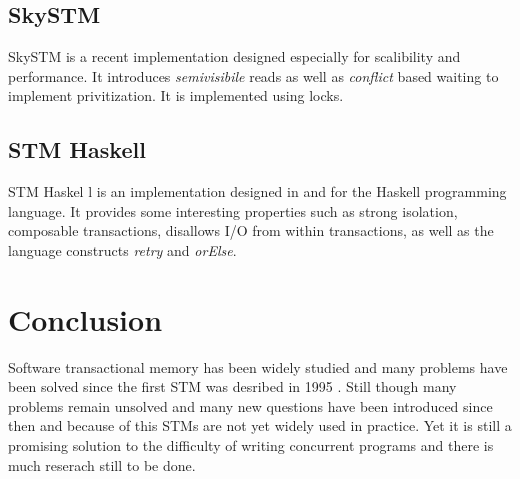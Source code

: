 \subsection{SkySTM}
SkySTM \cite{lev:anatomy:transact:2009} is a recent implementation designed especially for scalibility and performance.
It introduces \emph{semivisibile} reads as well as \emph{conflict} based waiting to implement privitization.
It is implemented using locks.

\subsection{STM Haskell}
STM Haskel \cite{sjbc000}l is an implementation designed in and for the Haskell programming language.
It provides some interesting properties such as strong isolation, composable transactions, disallows I/O from within transactions, as well as the language constructs \emph{retry} and \emph{orElse}.

\section{Conclusion}
Software transactional memory has been widely studied and many problems have been solved since the first STM was desribed in 1995 \cite{224987}.
Still though many problems remain unsolved and many new questions have been introduced since then and because of this STMs are not yet widely used in practice.
Yet it is still a promising solution to the difficulty of writing concurrent programs and there is much reserach still to be done.

% 
% 
% 